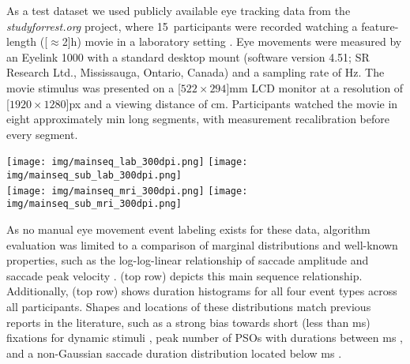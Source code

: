 As a test dataset we used publicly available eye tracking data from the
\textit{studyforrest.org} project, where 15~participants were recorded watching
a feature-length (\unit[$\approx$2]{h}) movie in a laboratory setting
\citep{Hanke2016}. Eye movements were measured by an Eyelink 1000 with a
standard desktop mount (software version 4.51; SR Research Ltd., Mississauga,
Ontario, Canada) and a sampling rate of \unit[1000]{Hz}. The movie stimulus was
presented on a \unit[$522\times294$]{mm} LCD monitor at a resolution of
\unit[$1920\times1280$]{px} and a viewing distance of \unit[85]{cm}. Participants
watched the movie in eight approximately \unit[15]{min} long segments,
with measurement recalibration before every segment.

\begin{figure*}[tbp]
  \texttt{[image: img/mainseq\_lab\_300dpi.png]}
  \texttt{[image: img/mainseq\_sub\_lab\_300dpi.png]} \\
  \texttt{[image: img/mainseq\_mri\_300dpi.png]}
  \texttt{[image: img/mainseq\_sub\_mri\_300dpi.png]}

  \caption{Main sequence of eye movement events during one 15 minute sequence of
  the movie (segment 2) for lab (top), and MRI participants (bottom). Data
  across all participants per dataset is shown on the left, and data for a single
  exemplary participant on the right.}

  \label{fig:overallComp}
\end{figure*}

As no manual eye movement event labeling exists for these data, algorithm
evaluation was limited to a comparison of marginal distributions and well-known
properties, such as the log-log-linear relationship of saccade amplitude and
saccade peak velocity \citep{bahill1975main}.  (top row)
depicts this main sequence relationship.
%
Additionally,  (top row) shows duration histograms for all four event
types across all participants. Shapes and locations of these distributions
match previous reports in the literature, such as a strong bias towards short
(less than \unit[500]{ms}) fixations for dynamic stimuli
\citep[Fig.~3]{dorr2010variability}, peak number of PSOs with durations between
\unit[10-20]{ms} \citep[Fig.~11]{Nystrom2010AnData}, and a non-Gaussian saccade
duration distribution located below \unit[100]{ms} \citep[Fig.~8, albeit for
static scene perception]{Nystrom2010AnData}.

